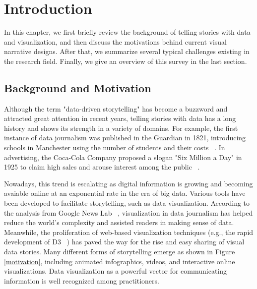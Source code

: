 \chapter{Introduction}\label{sec-introduction}
In this chapter, we first briefly review the background of telling stories with data and visualization, and then discuss the motivations behind current visual narrative designs. After that, we summarize several typical challenges existing in the research field. Finally, we give an overview of this survey in the last section.


\section{Background and Motivation}

Although the term "data-driven storytelling" has become a buzzword and attracted great attention in recent years, telling stories with data has a long history and shows its strength in a variety of domains. For example, the first instance of data journalism was published in the Guardian in 1821, introducing schools in Manchester using the number of students and their costs ~\cite{Veglis2017}.  In advertising, the Coca-Cola Company proposed a slogan "Six Million a Day" in 1925 to claim high sales and arouse interest among the public ~\cite{coca-cola}. 


Nowadays, this trend is escalating as digital information is growing and becoming avaiable online at an exponential rate in the era of big data. Various tools have been developed to facilitate storytelling, such as data visualization. According to the analysis from Google News Lab ~\cite{GoogleNews}, visualization in data journalism has helped reduce the world's complexity and assisted readers in making sense of data. Meanwhile, the proliferation of web-based visualization techniques (e.g., the rapid development of D3 ~\cite{Bostock2011}) has paved the way for the rise and easy sharing of visual data stories. Many different forms of storytelling emerge  as shown in Figure \ref{motivation}, including animated infographics, videos, and interactive online visualizations. Data visualization as a powerful vector for communicating information is well recognized among practitioners.


